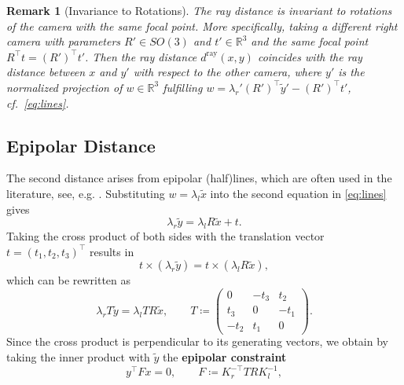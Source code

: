 \documentclass[10pt, twocolumn]{article}
\newtheorem{remark}[theorem]{Remark}
\theoremstyle{definition}
\newcommand{\R}{{\ensuremath{\mathbb{R}}}}
\begin{document}
\begin{remark}[Invariance to Rotations] \label{rem:rot}
    The ray distance is invariant to rotations of the camera with the same focal point.
    More specifically, taking a different right camera with parameters $R'\in SO(3)$ and $t'\in\R^3$ and the same focal point $R^\top t = (R')^\top t'$.
    Then the ray distance $d^\mathrm{ray}(x,y)$ 
    coincides with the ray distance between $x$ and $y'$
    with respect to the other camera, where $ y'$  is 
    the normalized projection of $w\in\R^3$ 
    fulfilling $w=\lambda_{r}'(R')^\top \tilde y' - (R')^\top t'$, cf.\ \eqref{eq:lines}.
\end{remark}

\subsection{Epipolar Distance}\label{sec:epi}
The second distance arises from epipolar (half)lines, which are often used in the
literature, see, e.g. \cite{Darmon2021,Haming2007,Pollefeys1999}.
Substituting $w = \lambda_l \tilde{x}$ into the second equation in \eqref{eq:lines}
gives
\begin{equation}
\lambda_r \tilde{y} = \lambda_l R \tilde{x} + t.
\end{equation}
Taking the cross product of both sides with the translation vector $t = (t_1,t_2,t_3)^\top$ results in
\begin{equation} \label{eq:epi-cross}
t \times (\lambda_r \tilde{y}) = t \times (\lambda_l R \tilde{x}),
\end{equation}
which can be rewritten as
\begin{equation} 
\lambda_r T \tilde{y} = \lambda_l T R \tilde{x}, 
\qquad
T \coloneqq
\left(
\begin{array}{rrr}
0 & -t_3 & t_2 \\
t_3 & 0 & -t_1 \\
-t_2 & t_1 & 0
\end{array}
\right).
\end{equation}
Since the cross product is perpendicular to its generating vectors, we obtain by taking the inner product with $\tilde y$
the \textbf{epipolar constraint} 
\begin{equation} \label{eq:fundamental_constraint}
y^\top F x = 0, \qquad  F \coloneqq K_r^{-\top} T R K_l^{-1},
\end{equation}
\end{document}
